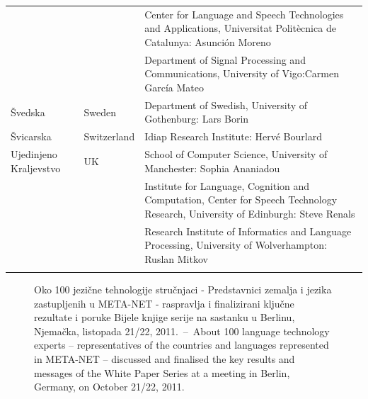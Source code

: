 \begin{longtable}{llp{115mm}}
  & & Center for Language and Speech Technologies and Applications, Universitat Politècnica de Catalunya:  Asunción Moreno \\ \addlinespace 
  & & Department of Signal Processing and Communications, University of Vigo:\newline Carmen García Mateo \\ \addlinespace 
  Švedska & \textcolor{grey1}{Sweden} & Department of Swedish, University of Gothenburg: Lars Borin \\ \addlinespace 
  Švicarska & \textcolor{grey1}{Switzerland} & Idiap Research Institute: Hervé Bourlard \\ \addlinespace 
  Ujedinjeno Kraljevstvo & \textcolor{grey1}{UK} & 
  School of Computer Science, University of Manchester: Sophia Ananiadou \\ \addlinespace 
  & & Institute for Language, Cognition and Computation, Center for Speech Technology Research, University of Edinburgh: Steve Renals \\ \addlinespace 
  & & Research Institute of Informatics and Language Processing, University of Wolverhampton: Ruslan Mitkov \\ \addlinespace 
\end{longtable}
\normalsize

\renewcommand*{\figureformat}{} 
\renewcommand*{\captionformat}{} 

\begin{figure}[htbp] 
  \center
  \iftoggle{lowres}{%
  }{%
  }
    \caption{Oko 100 jezične tehnologije stručnjaci - Predstavnici zemalja i
      jezika zastupljenih u META-NET - raspravlja i finalizirani ključne
      rezultate i poruke Bijele knjige serije na sastanku u Berlinu, Njemačka,
      listopada 21/22, 2011.~--~\textcolor{grey1}{About 100 language technology
      experts -- representatives of the countries and languages represented in
      META-NET -- discussed and finalised the key results and messages of the
      White Paper Series at a meeting in Berlin, Germany, on October 21/22,
      2011.}}
    \medskip {}
\end{figure} 

\cleardoublepage

\label{whitepaperseries}


